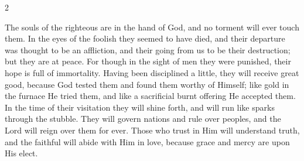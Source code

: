 \begin{multicols}{2}








  The souls of the righteous are in the hand of God, and no torment will ever
  touch them. In the eyes of the foolish they seemed to have died, and their
  departure was thought to be an affliction, and their going from us to be
  their destruction; but they are at peace. For though in the sight of men they
  were punished, their hope is full of immortality. Having been disciplined a
  little, they will receive great good, because God tested them and found them
  worthy of Himself; like gold in the furnace He tried them, and like a
  sacrificial burnt offering He accepted them. In the time of their visitation
  they will shine forth, and will run like sparks through the stubble. They
  will govern nations and rule over peoples, and the Lord will reign over them
  for ever. Those who trust in Him will understand truth, and the faithful will
  abide with Him in love, because grace and mercy are upon His elect.

  \vspace{2mm}




\end{multicols}
